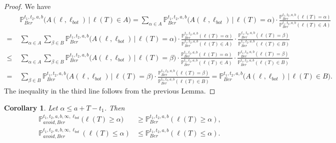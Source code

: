\documentclass[12pt]{article}
\newtheorem{cor}{Corollary}
\begin{document}
	\begin{proof}
		We have
		\begin{align*}
			& \mathbb{P}^{t_1, t_2, a, b}_{Ber}\big(A(\ell,\ell_{bot})\,\big|\,\ell(T) \in A\big) = \sum_{\alpha\in A} \mathbb{P}^{t_1, t_2, a, b}_{Ber}\big(A(\ell,\ell_{bot})\,\big|\,\ell(T) = \alpha\big) \cdot \frac{\mathbb{P}^{t_1, t_2, a, b}_{Ber}(\ell(T) = \alpha)}{\mathbb{P}^{t_1, t_2, a, b}_{Ber}(\ell(T) \in A)}\\
			= \; & \sum_{\alpha\in A}\sum_{\beta\in B} \mathbb{P}^{t_1, t_2, a, b}_{Ber}\big(A(\ell,\ell_{bot})\,\big|\,\ell(T) = \alpha\big) \cdot \frac{\mathbb{P}^{t_1, t_2, a, b}_{Ber}(\ell(T) = \alpha)}{\mathbb{P}^{t_1, t_2, a, b}_{Ber}(\ell(T) \in A)} \cdot \frac{\mathbb{P}^{t_1, t_2, a, b}_{Ber}(\ell(T) = \beta)}{\mathbb{P}^{t_1, t_2, a, b}_{Ber}(\ell(T) \in B)}\\
			\leq \; & \sum_{\alpha\in A}\sum_{\beta\in B} \mathbb{P}^{t_1, t_2, a, b}_{Ber}\big(A(\ell,\ell_{bot})\,\big|\,\ell(T) = \beta\big) \cdot \frac{\mathbb{P}^{t_1, t_2, a, b}_{Ber}(\ell(T) = \alpha)}{\mathbb{P}^{t_1, t_2, a, b}_{Ber}(\ell(T) \in A)} \cdot \frac{\mathbb{P}^{t_1, t_2, a, b}_{Ber}(\ell(T) = \beta)}{\mathbb{P}^{t_1, t_2, a, b}_{Ber}(\ell(T) \in B)}\\
			= \; & \sum_{\beta \in B} \mathbb{P}^{t_1, t_2, a, b}_{Ber}\big(A(\ell,\ell_{bot})\,\big|\,\ell(T) = \beta\big) \cdot \frac{\mathbb{P}^{t_1, t_2, a, b}_{Ber}(\ell(T) = \beta)}{\mathbb{P}^{t_1, t_2, a, b}_{Ber}(\ell(T) \in B)} = \mathbb{P}^{t_1, t_2, a, b}_{Ber}\big(A(\ell,\ell_{bot})\,\big|\,\ell(T) \in B\big).
		\end{align*}
		The inequality in the third line follows from the previous Lemma.
	\end{proof}

	\begin{cor}
		Let $\alpha \leq a + T - t_1$. Then
		\begin{align*}
		\mathbb{P}^{t_1,t_2,a,b,\infty,\ell_{bot}}_{avoid,Ber} \big(\ell(T)\geq\alpha) &\geq \mathbb{P}^{t_1,t_2,a,b}_{Ber} (\ell(T)\geq \alpha),\\
		\mathbb{P}^{t_1,t_2,a,b,\infty,\ell_{bot}}_{avoid,Ber} (\ell(T)\leq\alpha) &\leq \mathbb{P}^{t_1,t_2,a,b}_{Ber} (\ell(T)\leq \alpha).
		\end{align*}
	\end{cor}
\end{document}
